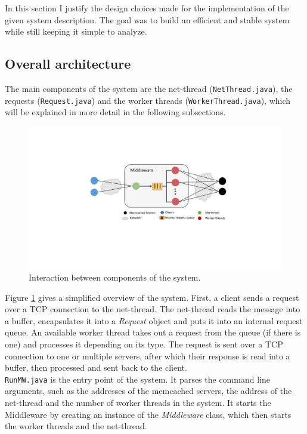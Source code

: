 
In this section I justify the design choices made for the implementation of the given system description. The goal was to build an efficient and stable system while still keeping it simple to analyze. 

\subsection{Overall architecture}
The main components of the system are the net-thread (\texttt{NetThread.java}), the requests  (\texttt{Request.java}) and the worker threads (\texttt{WorkerThread.java}), which will be explained in more detail in the following subsections. \\

\begin{figure}[!h]
    \centering
	\includegraphics[scale=0.7]{figures/0_SystemOverview/overview_figure.pdf}
	\caption{Interaction between components of the system.}
	\label{overview}
\end{figure}

Figure \ref{overview} gives a simplified overview of the system. First, a client sends a request over a TCP connection to the net-thread. The net-thread reads the message into a buffer, encapsulates it into a \textit{Request} object and puts it into an internal request queue. An available worker thread takes out a request from the queue (if there is one) and processes it depending on its type. The request is sent over a TCP connection to one or multiple servers, after which their response is read into a buffer, then processed and sent back to the client. \\

\texttt{RunMW.java} is the entry point of the system. It parses the command line arguments, such as the addresses of the memcached servers, the address of the net-thread and the number of worker threads in the system. It starts the Middleware by creating an instance of the \textit{Middleware} class, which then starts the worker threads and the net-thread. 

